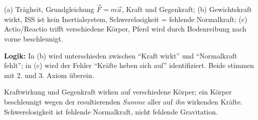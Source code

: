 \begin{ergebnis}
(a) Trägheit, Grundgleichung $\vec F=m\vec a$, Kraft und Gegenkraft;
(b) Gewichtskraft wirkt, ISS ist kein Inertialsystem, Schwerelosigkeit =
fehlende Normalkraft; (c) Actio/Reactio trifft verschiedene Körper,
Pferd wird durch Bodenreibung nach vorne beschleunigt.
\end{ergebnis}

\begin{kontrolle}
\textbf{Logik:} In (b) wird unterschieden zwischen ``Kraft wirkt'' und
``Normalkraft fehlt''; in (c) wird der Fehler ``Kräfte heben sich auf''
identifiziert. Beide stimmen mit 2. und 3. Axiom überein. \checkmark
\end{kontrolle}

\begin{merksatz}
Kraftwirkung und Gegenkraft wirken auf verschiedene Körper; ein Körper
beschleunigt wegen der resultierenden \emph{Summe} aller auf \emph{ihn}
wirkenden Kräfte. Schwerelosigkeit ist fehlende Normalkraft, nicht
fehlende Gravitation.
\end{merksatz}
